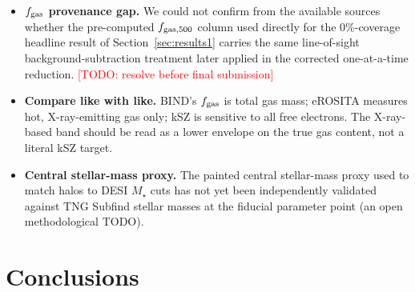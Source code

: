 \documentclass[11pt]{article}
\newcommand{\fgas}{f_{\rm gas}}
\newcommand{\todo}[1]{\textcolor{red}{[TODO: #1]}}
\begin{document}
\begin{itemize}
physical and require no additional $1/a^2$ redshift weighting, consistent with
this project's standing normalization convention, previously validated against
Planck.
\item \textbf{$\fgas$ provenance gap.} We could not confirm from the available
sources whether the pre-computed $f_{\rm gas,500}$ column used directly for the
0\%-coverage headline result of Section~\ref{sec:results1} carries the same
line-of-sight background-subtraction treatment later applied in the corrected
one-at-a-time reduction. \todo{resolve before final submission}
\item \textbf{Compare like with like.} BIND's $\fgas$ is total gas mass;
eROSITA measures hot, X-ray-emitting gas only; kSZ is sensitive to all free
electrons. The X-ray-based band should be read as a lower envelope on the true
gas content, not a literal kSZ target.
\item \textbf{Central stellar-mass proxy.} The painted central stellar-mass
proxy used to match halos to DESI $M_\star$ cuts has not yet been
independently validated against TNG Subfind stellar masses at the fiducial
parameter point (an open methodological TODO).
\end{itemize}

\section{Conclusions}\label{sec:conclusions}
\end{document}
